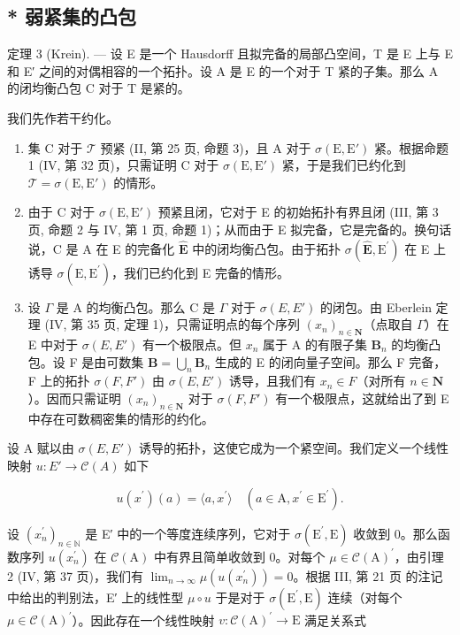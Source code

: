 \subsection{* 弱紧集的凸包}

定理 3 (Krein). --- 设 E 是一个 Hausdorff 且拟完备的局部凸空间，T 是 E 上与 E 和 E′ 之间的对偶相容的一个拓扑。设 A 是 E 的一个对于 T 紧的子集。那么 A 的闭均衡凸包 C 对于 T 是紧的。

我们先作若干约化。

\begin{enumerate}
\def\labelenumi{\Alph{enumi})}
\item
  集 C 对于 \(\mathcal{T}\) 预紧 (II, 第 25 页, 命题 3)，且 A 对于 \(\sigma(\mathrm{E}, \mathrm{E}')\) 紧。根据命题 1 (IV, 第 32 页)，只需证明 C 对于 \(\sigma(\mathrm{E}, \mathrm{E}')\) 紧，于是我们已约化到 \(\mathcal{T} = \sigma(\mathrm{E}, \mathrm{E}')\) 的情形。
\item
  由于 C 对于 \(\sigma(\mathrm{E}, \mathrm{E}')\) 预紧且闭，它对于 E 的初始拓扑有界且闭 (III, 第 3 页, 命题 2 与 IV, 第 1 页, 命题 1)；从而由于 E 拟完备，它是完备的。换句话说，C 是 A 在 E 的完备化 \(\hat{\mathbf{E}}\) 中的闭均衡凸包。由于拓扑 \(\sigma (\hat{\mathbf{E}},\mathrm{E}^{\prime})\) 在 E 上诱导 \(\sigma (\mathrm{E},\mathrm{E}^{\prime})\)，我们已约化到 E 完备的情形。
\item
  设 \(\Gamma\) 是 A 的均衡凸包。那么 C 是 \(\Gamma\) 对于 \(\sigma(E, E')\) 的闭包。由 Eberlein 定理 (IV, 第 35 页, 定理 1)，只需证明点的每个序列 \((x_n)_{n \in \mathbf{N}}\)（点取自 \(\Gamma\)）在 E 中对于 \(\sigma(E, E')\) 有一个极限点。但 \(x_n\) 属于 A 的有限子集 \(\mathbf{B}_n\) 的均衡凸包。设 F 是由可数集 \(\mathbf{B} = \bigcup_{n} \mathbf{B}_n\) 生成的 E 的闭向量子空间。那么 F 完备，F 上的拓扑 \(\sigma(F, F')\) 由 \(\sigma(E, E')\) 诱导，且我们有 \(x_n \in F\)（对所有 \(n \in \mathbf{N}\)）。因而只需证明 \((x_n)_{n \in \mathbf{N}}\) 对于 \(\sigma(F, F')\) 有一个极限点，这就给出了到 E 中存在可数稠密集的情形的约化。
\end{enumerate}

设 A 赋以由 \(\sigma(E, E')\) 诱导的拓扑，这使它成为一个紧空间。我们定义一个线性映射 \(u: E' \to \mathcal{C}(A)\) 如下

\[
u (x ^ {\prime}) (a) = \langle a, x ^ {\prime} \rangle \quad (a \in \mathrm{A}, x ^ {\prime} \in \mathrm{E} ^ {\prime}).\tag{7}
\]

设 \((x_{n}^{\prime})_{n\in\mathbb{N}}\) 是 E′ 中的一个等度连续序列，它对于 \(\sigma(\mathrm{E}^{\prime},\mathrm{E})\) 收敛到 0。那么函数序列 \(u(x_{n}^{\prime})\) 在 \(\mathcal{C}(\mathrm{A})\) 中有界且简单收敛到 0。对每个 \(\mu\in\mathcal{C}(\mathrm{A})^{\prime}\)，由引理 2 (IV, 第 37 页)，我们有 \(\lim_{n\to\infty}\mu(u(x_{n}^{\prime}))=0\)。根据 III, 第 21 页 的注记中给出的判别法，E′ 上的线性型 \(\mu\circ u\) 于是对于 \(\sigma(\mathrm{E}^{\prime},\mathrm{E})\) 连续（对每个 \(\mu\in\mathcal{C}(\mathrm{A})^{\prime}\)）。因此存在一个线性映射 \(v:\mathcal{C}(\mathrm{A})^{\prime}\to\mathrm{E}\) 满足关系式

